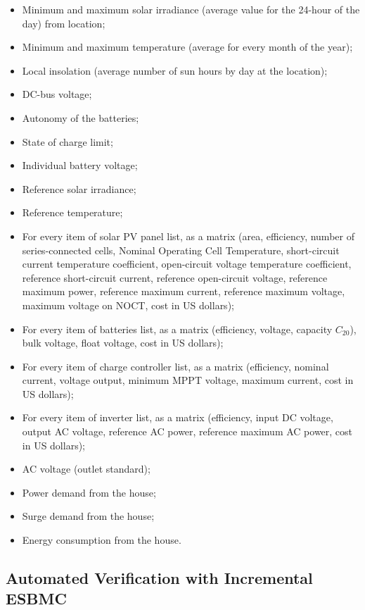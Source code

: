 \begin{itemize}
\item Minimum and maximum solar irradiance (average value for the 24-hour of the day) from location;
\item Minimum and maximum temperature (average for every month of the year);
\item Local insolation (average number of sun hours by day at the location);
\item DC-bus voltage;
\item Autonomy of the batteries;
\item State of charge limit;
\item Individual battery voltage;
\item Reference solar irradiance;
\item Reference temperature;
\item For every item of solar PV panel list, as a matrix (area, efficiency, number of series-connected cells, Nominal Operating Cell Temperature, short-circuit current temperature coefficient, open-circuit voltage temperature coefficient, reference short-circuit current, reference open-circuit voltage, reference maximum power, reference maximum current, reference maximum voltage, maximum voltage on NOCT, cost in US dollars);
\item For every item of batteries list, as a matrix (efficiency, voltage, capacity $C_{20}$), bulk voltage, float voltage, cost in US dollars);
\item For every item of charge controller list, as a matrix (efficiency, nominal current, voltage output, minimum MPPT voltage, maximum current, cost in US dollars);
\item For every item of inverter list, as a matrix (efficiency, input DC voltage, output AC voltage, reference AC power, reference maximum AC power, cost in US dollars);
\item AC voltage (outlet standard);
\item Power demand from the house;
\item Surge demand from the house;
\item Energy consumption from the house.
\end{itemize}

\subsection{Automated Verification with Incremental ESBMC}


